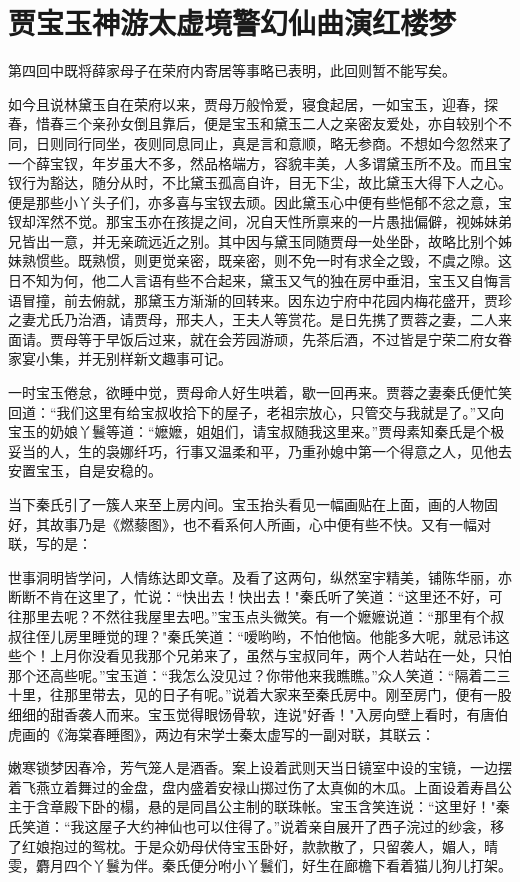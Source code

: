 \chapter{贾宝玉神游太虚境\ttlbreak 警幻仙曲演红楼梦}

第四回中既将薛家母子在荣府内寄居等事略已表明，此回则暂不能写矣。

如今且说林黛玉自在荣府以来，贾母万般怜爱，寝食起居，一如宝玉，迎春，探春，惜春三个亲孙女倒且靠后，便是宝玉和黛玉二人之亲密友爱处，亦自较别个不同，日则同行同坐，夜则同息同止，真是言和意顺，略无参商。不想如今忽然来了一个薛宝钗，年岁虽大不多，然品格端方，容貌丰美，人多谓黛玉所不及。而且宝钗行为豁达，随分从时，不比黛玉孤高自许，目无下尘，故比黛玉大得下人之心。便是那些小丫头子们，亦多喜与宝钗去顽。因此黛玉心中便有些悒郁不忿之意，宝钗却浑然不觉。那宝玉亦在孩提之间，况自天性所禀来的一片愚拙偏僻，视姊妹弟兄皆出一意，并无亲疏远近之别。其中因与黛玉同随贾母一处坐卧，故略比别个姊妹熟惯些。既熟惯，则更觉亲密，既亲密，则不免一时有求全之毁，不虞之隙。这日不知为何，他二人言语有些不合起来，黛玉又气的独在房中垂泪，宝玉又自悔言语冒撞，前去俯就，那黛玉方渐渐的回转来。因东边宁府中花园内梅花盛开，贾珍之妻尤氏乃治酒，请贾母，邢夫人，王夫人等赏花。是日先携了贾蓉之妻，二人来面请。贾母等于早饭后过来，就在会芳园游顽，先茶后酒，不过皆是宁荣二府女眷家宴小集，并无别样新文趣事可记。

一时宝玉倦怠，欲睡中觉，贾母命人好生哄着，歇一回再来。贾蓉之妻秦氏便忙笑回道：“我们这里有给宝叔收拾下的屋子，老祖宗放心，只管交与我就是了。”又向宝玉的奶娘丫鬟等道：“嬷嬷，姐姐们，请宝叔随我这里来。”贾母素知秦氏是个极妥当的人，生的袅娜纤巧，行事又温柔和平，乃重孙媳中第一个得意之人，见他去安置宝玉，自是安稳的。

当下秦氏引了一簇人来至上房内间。宝玉抬头看见一幅画贴在上面，画的人物固好，其故事乃是《燃藜图》，也不看系何人所画，心中便有些不快。又有一幅对联，写的是：

世事洞明皆学问，人情练达即文章。及看了这两句，纵然室宇精美，铺陈华丽，亦断断不肯在这里了，忙说：“快出去！快出去！"秦氏听了笑道：“这里还不好，可往那里去呢？不然往我屋里去吧。”宝玉点头微笑。有一个嬷嬷说道：“那里有个叔叔往侄儿房里睡觉的理？"秦氏笑道：“嗳哟哟，不怕他恼。他能多大呢，就忌讳这些个！上月你没看见我那个兄弟来了，虽然与宝叔同年，两个人若站在一处，只怕那个还高些呢。”宝玉道：“我怎么没见过？你带他来我瞧瞧。”众人笑道：“隔着二三十里，往那里带去，见的日子有呢。”说着大家来至秦氏房中。刚至房门，便有一股细细的甜香袭人而来。宝玉觉得眼饧骨软，连说"好香！"入房向壁上看时，有唐伯虎画的《海棠春睡图》，两边有宋学士秦太虚写的一副对联，其联云：

嫩寒锁梦因春冷，芳气笼人是酒香。案上设着武则天当日镜室中设的宝镜，一边摆着飞燕立着舞过的金盘，盘内盛着安禄山掷过伤了太真侞的木瓜。上面设着寿昌公主于含章殿下卧的榻，悬的是同昌公主制的联珠帐。宝玉含笑连说：“这里好！"秦氏笑道：“我这屋子大约神仙也可以住得了。”说着亲自展开了西子浣过的纱衾，移了红娘抱过的鸳枕。于是众奶母伏侍宝玉卧好，款款散了，只留袭人，媚人，晴雯，麝月四个丫鬟为伴。秦氏便分咐小丫鬟们，好生在廊檐下看着猫儿狗儿打架。

